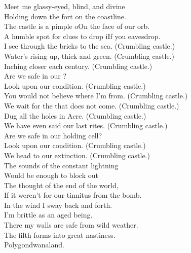 
\label{album:polygondwanaland}





Meet me glassy-eyed, blind, and divine \\
Holding down the fort on the coastline. \\
The castle is a pimple oOn the face of our orb. \\
A humble spot for clues to drop iIf you eavesdrop. \\

I see through the bricks to the sea. (Crumbling castle.) \\
Water's rising up, thick and green. (Crumbling castle.) \\
Inching closer each century. (Crumbling castle.) \\
Are we safe in our ? \\

Look upon our condition. (Crumbling castle.) \\
You would not believe where I'm from. (Crumbling castle.) \\

We wait for the  that does not come. (Crumbling castle.) \\
Dug all the holes in  Acre. (Crumbling castle.) \\
We have even said our last rites. (Crumbling castle.) \\

Are we safe in our holding cell? \\
Look upon our condition. (Crumbling castle.) \\
We head to our extinction. (Crumbling castle.) \\

The sounds of the constant lightning \\
Would be enough to block out \\
The thought of the end of the world, \\
If it weren't for our tinnitus from the bomb. \\

In the wind I sway back and forth. \\
I'm brittle as an aged  being. \\
There my walls are safe from wild weather. \\
The filth forms into great nastiness. \\
Polygondwanaland. \\


